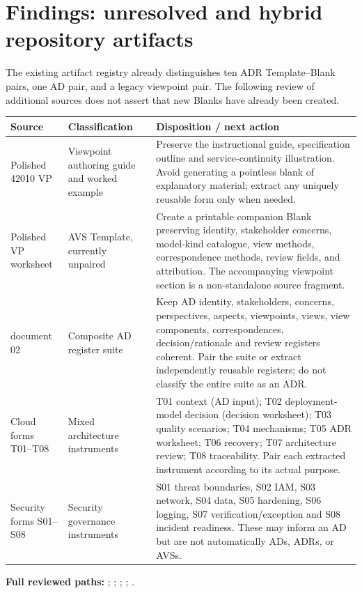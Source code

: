 \documentclass[10pt,letterpaper]{article}
\begin{document}
\section{Findings: unresolved and hybrid repository artifacts}
The existing artifact registry already distinguishes ten ADR
Template--Blank pairs, one AD pair, and a legacy viewpoint pair. The
following review of additional sources does not assert that new Blanks
have already been created.
\small
\begin{longtable}{@{}L{1.05in}L{1.22in}L{3.33in}@{}}
\toprule
\textbf{Source}&\textbf{Classification}&\textbf{Disposition / next action}\\
\midrule\endhead
Polished 42010 VP &
Viewpoint authoring guide and worked example &
Preserve the instructional guide, specification outline and
service-continuity illustration. Avoid generating a pointless
blank of explanatory material; extract any uniquely reusable form
only when needed.\\
\addlinespace
Polished VP worksheet &
AVS Template, currently unpaired &
Create a printable companion Blank preserving identity, stakeholder
concerns, model-kind catalogue, view methods, correspondence
methods, review fields, and attribution. The accompanying
viewpoint section is a non-standalone source fragment.\\
 document 02 &
Composite AD register suite &
Keep AD identity, stakeholders, concerns, perspectives, aspects,
viewpoints, views, view components, correspondences, decision/rationale
and review registers coherent. Pair the suite or extract independently
reusable registers; do not classify the entire suite as an ADR.\\
\addlinespace
Cloud forms T01--T08 &
Mixed architecture instruments &
T01 context (AD input); T02 deployment-model decision (decision
worksheet); T03 quality scenarios; T04 mechanisms; T05 ADR worksheet;
T06 recovery; T07 architecture review; T08 traceability. Pair each
extracted instrument according to its actual purpose.\\
\addlinespace
Security forms S01--S08 &
Security governance instruments &
S01 threat boundaries, S02 IAM, S03 network, S04 data,
S05 hardening, S06 logging, S07 verification/exception and
S08 incident readiness. These may inform an AD but are not
automatically ADs, ADRs, or AVSs.\\
\bottomrule
\end{longtable}
\normalsize
\textbf{Full reviewed paths:}
;
;
;
;
.
\end{document}

